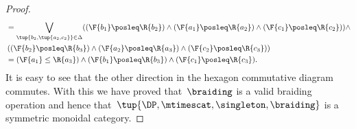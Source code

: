 \begin{proof}
\begin{equation}
\begin{aligned}
      &=\bigvee_{\tup{b_2,\tup{a_2,c_2}}\in \Delta}(\left(\F{b_1}\posleq \R{b_2} \right)\wedge \left(\F{a_1}\posleq \R{a_2} \right)\wedge \left( \F{c_1}\posleq \R{c_2}\right)) \wedge\\
      & \left(\left(\F{b_2}\posleq \R{b_3}\right)\wedge \left(\F{a_2}\posleq \R{a_3}\right) \wedge \left(\F{c_2}\posleq \R{c_3}\right)\right)\\
      &=(\F{a_1}\leq \R{a_3}) \wedge (\F{b_1}\posleq \R{b_3}) \wedge (\F{c_1}\posleq \R{c_3}).
    \end{aligned}
  \end{equation}
  It is easy to see that the other direction in the hexagon commutative diagram commutes. With this we have proved that~$\braiding$ is a valid braiding operation and hence that~$\tup{\DP, \mtimescat, \singleton, \braiding}$ is a symmetric monoidal category.
\end{proof}